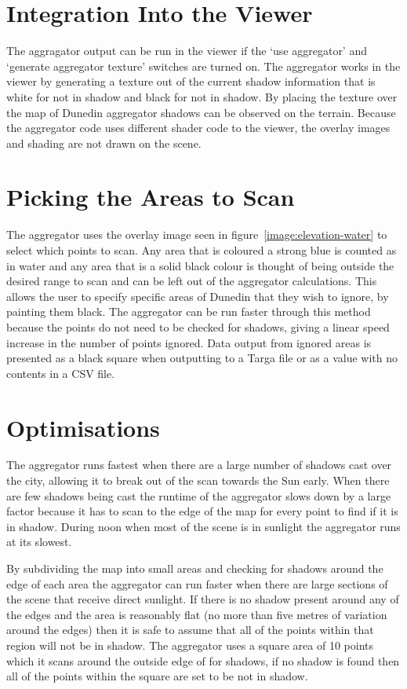 \documentclass[12pt]{report}
\begin{document}
\section{Integration Into the Viewer}
The aggragator output can be run in the viewer if the `use aggregator' and `generate aggregator texture' switches are turned on. The aggregator works in the viewer by generating a texture out of the current shadow information that is white for not in shadow and black for not in shadow. By placing the texture over the map of Dunedin aggregator shadows can be observed on the terrain. Because the aggregator code uses different shader code to the viewer, the overlay images and shading are not drawn on the scene.

\section{Picking the Areas to Scan}
The aggregator uses the overlay image seen in figure~\ref{image:elevation-water} to select which points to scan. Any area that is coloured a strong blue is counted as in water and any area that is a solid black colour is thought of being outside the desired range to scan and can be left out of the aggregator calculations. This allows the user to specify specific areas of Dunedin that they wish to ignore, by painting them black. The aggregator can be run faster through this method because the points do not need to be checked for shadows, giving a linear speed increase in the number of points ignored. Data output from ignored areas is presented as a black square when outputting to a Targa file or as a value with no contents in a CSV file.

\section{Optimisations}
The aggregator runs fastest when there are a large number of shadows cast over the city, allowing it to break out of the scan towards the Sun early. When there are few shadows being cast the runtime of the aggregator slows down by a large factor because it has to scan to the edge of the map for every point to find if it is in shadow. During noon when most of the scene is in sunlight the aggregator runs at its slowest.

By subdividing the map into small areas and checking for shadows around the edge of each area the aggregator can run faster when there are large sections of the scene that receive direct sunlight. If there is no shadow present around any of the edges and the area is reasonably flat (no more than five metres of variation around the edges) then it is safe to assume that all of the points within that region will not be in shadow. The aggregator uses a square area of 10 points which it scans around the outside edge of for shadows, if no shadow is found then all of the points within the square are set to be not in shadow.
\end{document}
